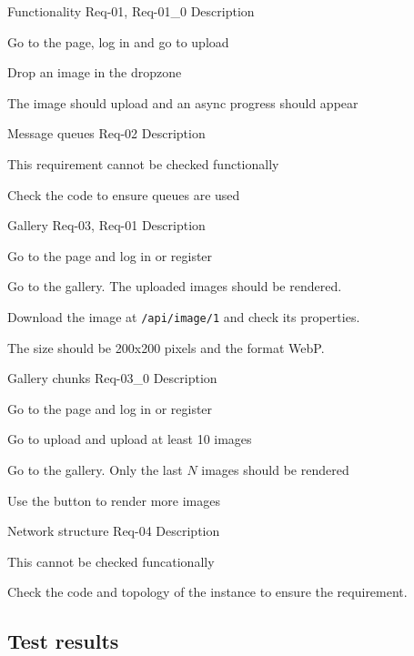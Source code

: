 \documentclass[../documentation.tex]{subfiles}
\begin{document}
    {Functionality}
    {Req-01, Req-01\_0}
    {Description}
    {
        \item Go to the page, log in and go to upload
        \item Drop an image in the dropzone
        \item The image should upload and an async progress should appear
    }

    {Message queues}
    {Req-02}
    {Description}
    {
        \item This requirement cannot be checked functionally
        \item Check the code to ensure queues are used
    }

    {Gallery}
    {Req-03, Req-01}
    {Description}
    {
        \item Go to the page and log in or register
        \item Go to the gallery. The uploaded images should be rendered.
        \item Download the image at \texttt{/api/image/1} and check its properties.
        \item The size should be 200x200 pixels and the format WebP.
    }


    {Gallery chunks}
    {Req-03\_0}
    {Description}
    {
        \item Go to the page and log in or register
        \item Go to upload and upload at least 10 images
        \item Go to the gallery. Only the last \(N\) images should be rendered
        \item Use the button to render more images
    }

    {Network structure}
    {Req-04}
    {Description}
    {
        \item This cannot be checked funcationally
        \item Check the code and topology of the instance
            to ensure the requirement.
    }


\subsection{Test results}
\end{document}
